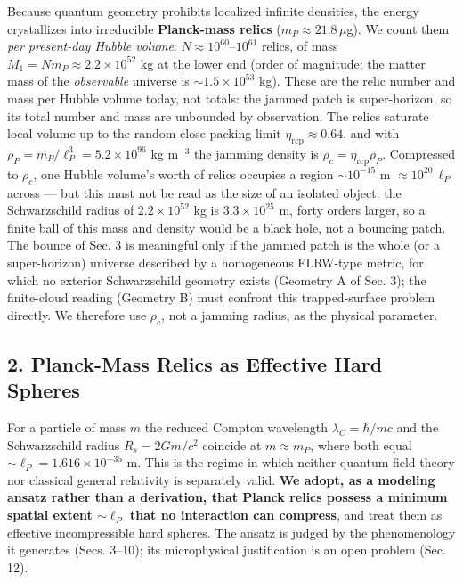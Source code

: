 \documentclass[
]{article}
\begin{document}
Because quantum geometry prohibits localized infinite densities, the
energy crystallizes into irreducible \textbf{Planck-mass relics}
(\(m_P \approx 21.8\,\mu\)g). We count them \emph{per present-day Hubble
volume}: \(N \approx 10^{60}\)--\(10^{61}\) relics, of mass
\(M_1 = N m_P \approx 2.2\times10^{52}\) kg at the lower end (order of
magnitude; the matter mass of the \emph{observable} universe is
\(\sim\!1.5\times10^{53}\) kg). These are the relic number and mass per
Hubble volume today, not totals: the jammed patch is super-horizon, so
its total number and mass are unbounded by observation. The relics
saturate local volume up to the random close-packing limit
\(\eta_{\text{rcp}} \approx 0.64\), and with
\(\rho_P = m_P/\ell_P^3 = 5.2\times10^{96}\) kg m\(^{-3}\) the jamming
density is \(\rho_c = \eta_{\text{rcp}}\rho_P\). Compressed to
\(\rho_c\), one Hubble volume's worth of relics occupies a region
\(\sim\!10^{-15}\) m \(\approx 10^{20}\,\ell_P\) across --- but this
must not be read as the size of an isolated object: the Schwarzschild
radius of \(2.2\times10^{52}\) kg is \(3.3\times10^{25}\) m, forty
orders larger, so a finite ball of this mass and density would be a
black hole, not a bouncing patch. The bounce of Sec. 3 is meaningful
only if the jammed patch is the whole (or a super-horizon) universe
described by a homogeneous FLRW-type metric, for which no exterior
Schwarzschild geometry exists (Geometry A of Sec. 3); the finite-cloud
reading (Geometry B) must confront this trapped-surface problem
directly. We therefore use \(\rho_c\), not a jamming radius, as the
physical parameter.

\hypertarget{planck-mass-relics-as-effective-hard-spheres}{%
\subsection{\texorpdfstring{\textbf{2. Planck-Mass Relics as Effective
Hard
Spheres}}{2. Planck-Mass Relics as Effective Hard Spheres}}\label{planck-mass-relics-as-effective-hard-spheres}}

For a particle of mass \(m\) the reduced Compton wavelength
\(\lambda_C = \hbar/mc\) and the Schwarzschild radius \(R_s = 2Gm/c^2\)
coincide at \(m \approx m_P\), where both equal
\(\sim\!\ell_P = 1.616\times10^{-35}\) m. This is the regime in which
neither quantum field theory nor classical general relativity is
separately valid. \textbf{We adopt, as a modeling ansatz rather than a
derivation, that Planck relics possess a minimum spatial extent
\(\sim\!\ell_P\) that no interaction can compress}, and treat them as
effective incompressible hard spheres. The ansatz is judged by the
phenomenology it generates (Secs. 3--10); its microphysical
justification is an open problem (Sec. 12).
\end{document}
